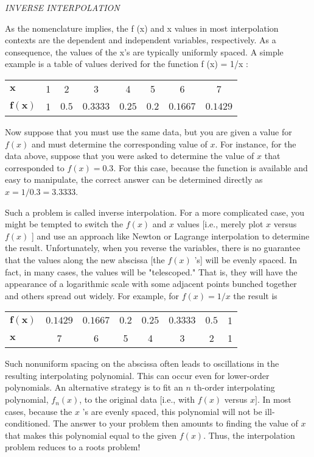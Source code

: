 \documentclass[../main.tex]{subfiles}
\begin{document}
\noindent\textit{INVERSE INTERPOLATION}

As the nomenclature implies, the f (x) and x values in most interpolation contexts are the
dependent and independent variables, respectively. As a consequence, the values of the x's
are typically uniformly spaced. A simple example is a table of values derived for the function
f (x) = 1/x :
\begin{center}
\begin{tabular}{lccccccc}
    \hline $\boldsymbol{x}$ & 1 & 2 & 3 & 4 & 5 & 6 & 7 \\
    $\boldsymbol{f}(\boldsymbol{x})$ & 1 & $0.5$ & $0.3333$ & $0.25$ & $0.2$ & $0.1667$ & $0.1429$ \\
    \hline
    \end{tabular}
\end{center}
    Now suppose that you must use the same data, but you are given a value for $f(x)$ and must determine the corresponding value of $x$. For instance, for the data above, suppose that you were asked to determine the value of $x$ that corresponded to $f(x)=0.3$. For this case, because the function is available and easy to manipulate, the correct answer can be determined directly as $x=1 / 0.3=3.3333$.
    
    Such a problem is called inverse interpolation. For a more complicated case, you might be tempted to switch the $f(x)$ and $x$ values [i.e., merely plot $x$ versus $f(x)$ ] and use an approach like Newton or Lagrange interpolation to determine the result. Unfortunately, when you reverse the variables, there is no guarantee that the values along the new abscissa [the $f(x)$ 's] will be evenly spaced. In fact, in many cases, the values will be "telescoped." That is, they will have the appearance of a logarithmic scale with some adjacent points bunched together and others spread out widely. For example, for $f(x)=1 / x$ the result is
    \begin{center}
    \begin{tabular}{lccccccc}
    \hline $\boldsymbol{f}(\boldsymbol{x})$ & $0.1429$ & $0.1667$ & $0.2$ & $0.25$ & $0.3333$ & $0.5$ & 1 \\
    $\boldsymbol{x}$ & 7 & 6 & 5 & 4 & 3 & 2 & 1 \\
    \hline
    \end{tabular}
\end{center}
    Such nonuniform spacing on the abscissa often leads to oscillations in the resulting interpolating polynomial. This can occur even for lower-order polynomials. An alternative strategy is to fit an $n$ th-order interpolating polynomial, $f_{n}(x)$, to the original data [i.e., with $f(x)$ versus $x]$. In most cases, because the $x$ 's are evenly spaced, this polynomial will not be ill-conditioned. The answer to your problem then amounts to finding the value of $x$ that makes this polynomial equal to the given $f(x)$. Thus, the interpolation problem reduces to a roots problem!
\end{document}
